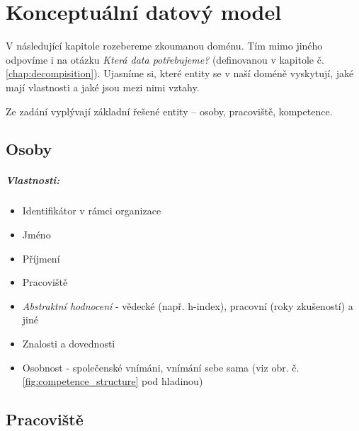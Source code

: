 \chapter{Konceptuální datový model} \label{chap:data_model} 
V následující kapitole rozebereme zkoumanou doménu. Tím mimo jiného odpovíme i na otázku \textit{Která data potřebujeme?} (definovanou v kapitole č. \ref{chap:decompisition}).
Ujasníme si, které entity se v naší doméně vyskytují, jaké mají vlastnosti a jaké jsou mezi nimi vztahy.\par 
\noindent Ze zadání vyplývají základní řešené entity – osoby, pracoviště, kompetence. 
\section{Osoby}
\paragraph{Vlastnosti:}
\begin{itemize}
\item Identifikátor v rámci organizace
\item Jméno
\item Příjmení
\item Pracoviště
\item \textit{Abstraktní hodnocení} - vědecké (např. h-index), pracovní (roky zkušeností) a jiné
\item Znalosti a dovednosti
\item Osobnost - společenské vnímáni, vnímání sebe sama (viz obr. č. \ref{fig:competence_structure} pod hladinou)
\end{itemize}
\section{Pracoviště}
